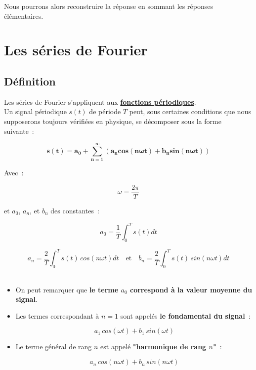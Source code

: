 Nous pourrons alors reconstruire la réponse en sommant les réponses élémentaires. 

\section{Les séries de Fourier}

\subsection*{Définition}

Les séries de Fourier s'appliquent aux \textbf{\underline{fonctions périodiques}}. \\

Un signal périodique $s(t)$ de période $T$ peut, sous certaines conditions que nous supposerons toujours vérifiées en physique, se décomposer sous la forme suivante~:

\begin{equation}
	\bm{s(t) = a_0 + \sum_{n=1}^{\infty} \left(a_ncos\left( n\omega t\right) + b_nsin\left(n\omega t\right) \right)}
\end{equation}

Avec~: 

$$\omega=\dfrac{2\pi}{T}$$

et $a_0$, $a_n$, et $b_n$ des constantes~:

$$ a_0 = \dfrac{1}{T} \int_{0}^{T} s(t)dt $$

$$ a_n = \dfrac{2}{T} \int_{0}^{T} s(t)\,cos\left( n\omega t \right) dt \quad  \text{et} \quad b_n = \dfrac{2}{T} \int_{0}^{T} s(t)\,sin\left( n\omega t \right) dt $$  \\

\begin{itemize}
\item On peut remarquer que \textbf{le terme $a_0$ correspond à la valeur moyenne du signal}. \\

\item Les termes correspondant à $n=1$ sont appelés \textbf{le fondamental du signal}~:

$$ a_1\,cos\left( \omega t \right) + b_1\,sin\left( \omega t\right) $$  

\item Le terme général de rang $n$ est appelé \textbf{"harmonique de rang $n$"}~:

$$ a_n\,cos\left( n\omega t \right) + b_n\,sin\left( n\omega t\right) $$

\end{itemize}

